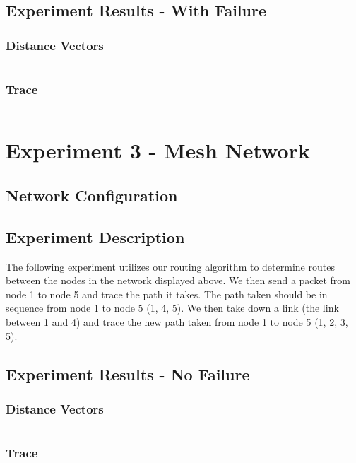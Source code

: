 \documentclass[fleqn,11pt]{article}
\begin{document}
  \subsection{Experiment Results - With Failure}
  \subsubsection{Distance Vectors}
    \begin{verbatim}
    \end{verbatim}
  \subsubsection{Trace}
    \begin{verbatim}
    \end{verbatim}

\section{Experiment 3 - Mesh Network}
  \subsection{Network Configuration}
    
  \subsection{Experiment Description}
    The following experiment utilizes our routing algorithm to determine routes
    between the nodes in the network displayed above. We then send a packet
    from node 1 to node 5 and trace the path it takes. The path taken should be
    in sequence from node 1 to node 5 (1, 4, 5). We then take down a link
    (the link between 1 and 4) and trace the new path taken
    from node 1 to node 5 (1, 2, 3, 5).

  \subsection{Experiment Results - No Failure}
  \subsubsection{Distance Vectors}
    \begin{verbatim}
    \end{verbatim}
  \subsubsection{Trace}
    \begin{verbatim}
    \end{verbatim}
\end{document}
